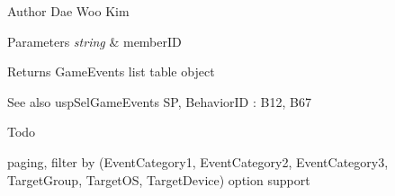 \begin{DoxyAuthor}{Author}
Dae Woo Kim 
\end{DoxyAuthor}

\begin{DoxyParams}{Parameters}
{\em string} & member\+ID \\
\hline
\end{DoxyParams}
\begin{DoxyReturn}{Returns}
Game\+Events list table object 
\end{DoxyReturn}
\begin{DoxySeeAlso}{See also}
usp\+Sel\+Game\+Events SP, Behavior\+ID \+: B12, B67 
\end{DoxySeeAlso}
\begin{DoxyRefDesc}{Todo}
\item[\hyperlink{a00001__todo000008}{Todo}]paging, filter by (Event\+Category1, Event\+Category2, Event\+Category3, Target\+Group, Target\+OS, Target\+Device) option support \end{DoxyRefDesc}
